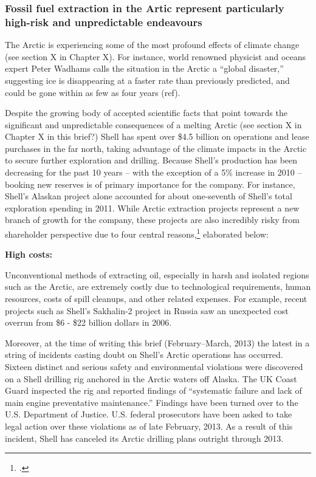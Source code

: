 	\subsubsection{Fossil fuel extraction in the Artic represent particularly high-risk and      
	         unpredictable endeavours}

The Arctic is experiencing some of the most profound effects of climate change (see section X in Chapter X). 
For instance, world renowned physicist and oceans expert Peter Wadhams calls the situation in the Arctic a ``global disaster,'' suggesting ice is disappearing at a faster rate than previously predicted, and could be gone within as few as four years (ref). 


Despite the growing body of accepted scientific facts that point towards the significant and unpredictable consequences of a melting Arctic (see section X in Chapter X in this brief?) Shell has spent over \$4.5 billion on operations and lease purchases in the far north, taking advantage of the climate impacts in the Arctic to secure further exploration and drilling. 
Because Shell’s production has been decreasing for the past 10 years – with the exception of a 5\% increase in 2010 –booking new reserves is of primary importance for the company. 
For instance, Shell's Alaskan project alone accounted for about one-seventh of Shell's total exploration spending in 2011. 
While Arctic extraction projects represent a new branch of growth for the company, these projects are also incredibly risky from shareholder perspective due to four central reasons,\footcite[For more on these four central risk factors see][]{OutInTheCold_2012}  elaborated below:

\textbf{High costs:} 

Unconventional methods of extracting oil, especially in harsh and isolated regions such as the Arctic, are extremely costly due to technological requirements, human resources, costs of spill cleanups, and other related expenses. 
For example, recent projects such as Shell’s Sakhalin-2 project in Russia saw an unexpected cost overrun from \$6 - \$22 billion dollars in 2006. 

Moreover, at the time of writing this brief (February--March, 2013) the latest in a string of incidents casting doubt on Shell’s Arctic operations has occurred. 
Sixteen distinct and serious safety and environmental violations were discovered on a Shell drilling rig anchored in the Arctic waters off Alaska. 
The UK Coast Guard inspected the rig and reported findings of ``systematic failure and lack of main engine preventative maintenance.'' 
Findings have been turned over to the U.S. Department of Justice. U.S. federal prosecutors have been asked to take legal action over these violations as of late February, 2013. 
As a result of this incident, Shell has canceled its Arctic drilling plans outright through 2013.



